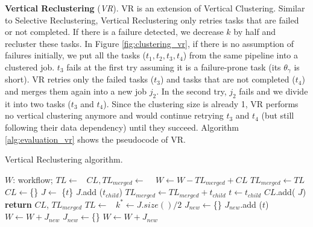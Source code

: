 \documentclass{IOS-Book-Article}
\begin{document}
\textbf{Vertical Reclustering} (\emph{VR}). VR is an extension of Vertical Clustering. Similar to Selective Reclustering, Vertical Reclustering only retries tasks that are failed or not completed.
If there is a failure detected, we decrease $k$ by half and recluster these tasks. In Figure \ref{fig:clustering_vr}, if there is no assumption of failures initially, we put all the tasks ($t_1, t_2, t_3, t_4$) from the same  pipeline into a clustered job. $t_3$ fails at the first try assuming it is a failure-prone task (its $\theta_{\gamma}$ is short). VR retries only the failed tasks ($t_3$) and tasks that are not completed ($t_4$) and merges them again into a new job $j_2$. In the second try, $j_2$ fails and we divide it into two tasks ($t_3$ and $t_4$). Since the clustering size is already 1, VR performs no vertical clustering anymore and would continue retrying $t_3$ and $t_4$ (but still following their data dependency) until they succeed. Algorithm \ref{alg:evaluation_vr} shows the pseudocode of VR. 

\begin{algorithm}[!htb]
	\footnotesize
	\caption{Vertical Reclustering algorithm.}
	\label{alg:evaluation_vr}
	\begin{algorithmic}[1]
		\Require $W$: workflow; 
				\State $TL\gets $\  
				\State $CL, TL_{merged}\gets$  \  
				\State $W \gets W - TL_{merged} + CL$   
			\EndFor
		\EndProcedure
			\State $TL_{merged}\gets TL$
			\State $CL\gets$\{\}
				\State $J\gets$ \{$t$\}
					\State $J$.add ($t_{child}$)
					\State $TL_{merged}\gets TL_{merged} + t_{child}$ 
					\State $t\gets t_{child}$
				\EndWhile
				\State  $CL$.add( $J$)
			\EndFor
			\State \textbf{return} $CL$, $TL_{merged}$
		\EndProcedure
			\State $TL \gets$\ 
			\State $k^*\gets J.size() / 2$ 
			\State $J_{new}\gets$\{\}
					\State $J_{new}$.add ($t$)
				\EndIf
					\State $W \gets W + J_{new}$
					\State $J_{new}\gets$\{\}
				\EndIf
			\EndFor
			\State $W \gets W + J_{new}$ 
		\EndProcedure
	\end{algorithmic}
\end{algorithm}
\end{document}
